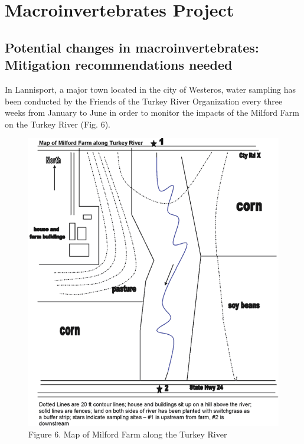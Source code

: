 \documentclass[
]{book}
\begin{document}
\hypertarget{macroinvertebrates-project}{%
\section*{Macroinvertebrates Project}\label{macroinvertebrates-project}}

\hypertarget{potential-changes-in-macroinvertebrates-mitigation-recommendations-needed}{%
\subsection*{Potential changes in macroinvertebrates: Mitigation recommendations needed}\label{potential-changes-in-macroinvertebrates-mitigation-recommendations-needed}}

In Lannisport, a major town located in the city of Westeros, water sampling has been conducted by the Friends of the Turkey River Organization every three weeks from January to June in order to monitor the impacts of the Milford Farm on the Turkey River (Fig. 6).

\begin{figure}
\centering
\includegraphics{images/figure6.png}
\caption{Figure 6. Map of Milford Farm along the Turkey River}
\end{figure}
\end{document}
